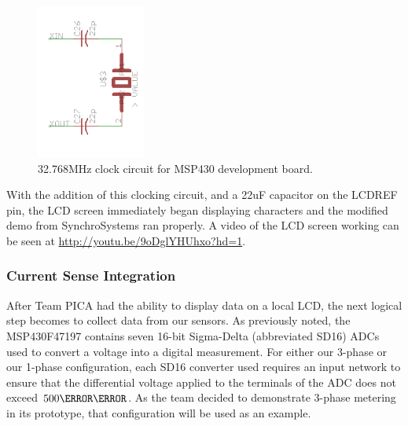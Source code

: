 \begin{figure}[htbp]
\begin{center}
\includegraphics[height=2in]{includes/emeterhw/aclk_crystal}
\caption{32.768MHz clock circuit for MSP430 development board.}
\label{fig:msp430_aclk}
\end{center}
\end{figure}

With the addition of this clocking circuit, and a 22uF capacitor on the LCDREF pin, the \ac{LCD} screen immediately began displaying characters and the modified demo from SynchroSystems ran properly. A video of the \ac{LCD} screen working can be seen at \url{http://youtu.be/9oDglYHUhxo?hd=1}.

\subsubsection{Current Sense Integration}
After Team PICA had the ability to display data on a local \ac{LCD}, the next logical step becomes to collect data from our sensors. As previously noted, the MSP430F47197 contains seven 16-bit Sigma-Delta (abbreviated SD16) \ac{ADC}s used to convert a voltage into a digital measurement. For either our 3-phase or our 1-phase configuration, each SD16 converter used requires an input network to ensure that the differential voltage applied to the terminals of the \ac{ADC} does not exceed $500\milli\volt$. As the team decided to demonstrate 3-phase metering in its prototype, that configuration will be used as an example.


